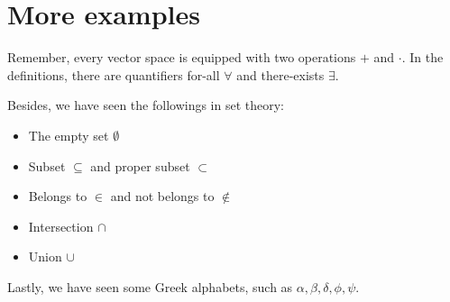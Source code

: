 \documentclass{article}
\begin{document}
\section{More examples}

Remember, every vector space is equipped with two operations $+$ and $\cdot$. In the definitions, there are quantifiers for-all $\forall$ and there-exists $\exists$. 

Besides, we have seen the followings in set theory:
\begin{itemize}
    \item The empty set $\emptyset$
    \item Subset $\subseteq$ and proper subset $\subset$
    \item Belongs to $\in$ and not belongs to $\notin$
    \item Intersection $\cap$
    \item Union $\cup$
\end{itemize}

Lastly, we have seen some Greek alphabets, such as $\alpha, \beta, \delta, \phi, \psi$.
\end{document}
